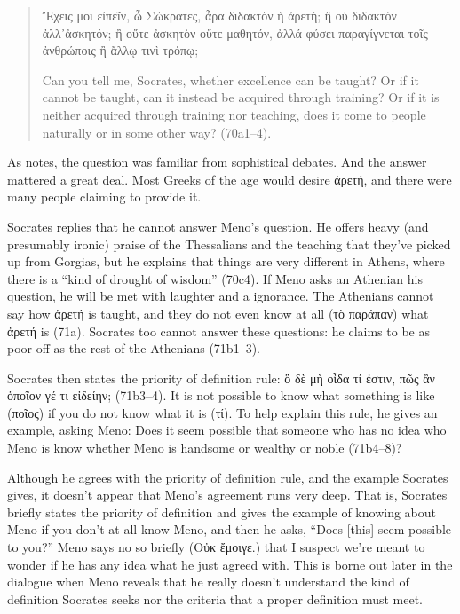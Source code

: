 \documentclass[12pt,letterpaper]{article}
\begin{document}
\begin{quote}
    \begin{greek}Ἔχεις μοι εἰπεῖν, ὦ Σώκρατες, ἆρα διδακτὸν ἡ ἀρετή; ἢ οὐ διδακτὸν ἀλλ᾽ἀσκητόν; ἢ οὔτε ἀσκητὸν οὔτε μαθητόν, ἀλλά φύσει παραγίγνεται τοῖς ἀνθρώποις ἢ ἄλλῳ τινὶ τρόπῳ;\end{greek}
    
   Can you tell me, Socrates, whether excellence can be taught? Or if it cannot be taught, can it instead be acquired through training? Or if it is neither acquired through training nor teaching, does it come to people naturally or in some other way? (70a1--4).
\end{quote}

As \textcite[4]{nehamas1985} notes, the question was familiar from sophistical debates. And the answer mattered a great deal. Most Greeks of the age would desire \textgreek{ἀρετή}, and there were many people claiming to provide it.

Socrates replies that he cannot answer Meno's question. He offers heavy (and presumably ironic) praise of the Thessalians and the teaching that they've picked up from Gorgias, but he explains that things are very different in Athens, where there is a ``kind of drought of wisdom'' (70c4). If Meno asks an Athenian his question, he will be met with laughter and a ignorance. The Athenians cannot say how \textgreek{ἀρετή} is taught, and they do not even know at all (\textgreek{τὸ παράπαν}) what \textgreek{ἀρετή} is (71a). Socrates too cannot answer these questions: he claims to be as poor off as the rest of the Athenians (71b1--3). 

Socrates then states the priority of definition rule: \textgreek{ὃ δὲ μὴ οἶδα τί ἐστιν, πῶς ἂν ὁποῖον γέ τι εἰδείην;} (71b3--4). It is not possible to know what something is like (\textgreek{ποῖος}) if you do not know what it is (\textgreek{τί}). To help explain this rule, he gives an example, asking Meno: Does it seem possible that someone who has no idea who Meno is know whether Meno is handsome or wealthy or noble (71b4--8)?

Although he agrees with the priority of definition rule, and the example Socrates gives, it doesn't appear that Meno's agreement runs very deep. That is, Socrates briefly states the priority of definition and gives the example of knowing about Meno if you don't at all know Meno, and then he asks, ``Does [this] seem possible to you?'' Meno says no so briefly (\textgreek{Οὐκ ἔμοιγε.}) that I suspect we're meant to wonder if he has any idea what he just agreed with. This is borne out later in the dialogue when Meno reveals that he really doesn't understand the kind of definition Socrates seeks nor the criteria that a proper definition must meet.
\end{document}
